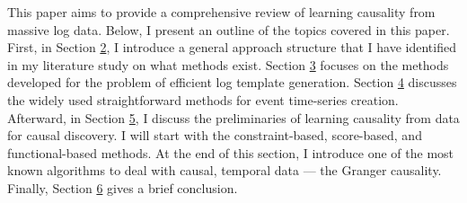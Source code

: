 This paper aims to provide a comprehensive review of learning causality from massive log data. Below, I present an outline of the topics covered in this paper. First, in Section \hyperref[sec:2]{2}, I introduce a general approach structure that I have identified in my literature study on what methods exist. Section \hyperref[sec:3]{3} focuses on the methods developed for the problem of efficient log template generation. Section \hyperref[sec:4]{4} discusses the widely used straightforward methods for event time-series creation. Afterward, in Section \hyperref[sec:5]{5}, I discuss the preliminaries of learning causality from data for causal discovery. I will start with the constraint-based, score-based, and functional-based methods. At the end of this section, I introduce one of the most known algorithms to deal with causal, temporal data — the Granger causality. Finally, Section \hyperref[sec:6]{6} gives a brief conclusion.

